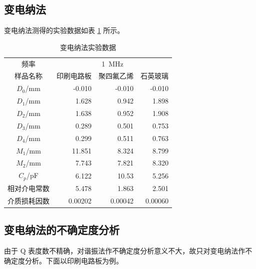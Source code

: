 \documentclass[a4paper,utf8]{article}
\begin{document}
\subsection{变电纳法}
变电纳法测得的实验数据如表 \ref{table:biandian} 所示。
\begin{table}[!ht]
    \caption{变电纳法实验数据} \label{table:biandian}
    \begin{tabular}{c*{3}{r}} \toprule
        频率 & \multicolumn{3}{c}{\SI{1}{\MHz}} \\
        样品名称 & 印刷电路板 & 聚四氟乙烯 & 石英玻璃 \\ \midrule
        $D_0$/\unit{\mm} & -0.010 & -0.010 & -0.010 \\
        $D_1$/\unit{\mm} & 1.628 & 0.942 & 1.898 \\
        $D_2$/\unit{\mm} & 1.638 & 0.952 & 1.908 \\
        $D_3$/\unit{\mm} & 0.289 & 0.501 & 0.753 \\
        $D_4$/\unit{\mm} & 0.299 & 0.511 & 0.763 \\
        $M_1$/\unit{\mm} & 11.851 & 8.324 & 8.799 \\
        $M_2$/\unit{\mm} & 7.743 & 7.821 & 8.320 \\
        $C_p$/\unit{\pF} & 6.122 & 10.53 & 5.256 \\
        相对介电常数 & 5.478 & 1.863 & 2.501 \\ 
        介质损耗因数 & 0.00202 & 0.00042 & 0.00060 \\ \bottomrule
    \end{tabular}
\end{table}

\subsection{变电纳法的不确定度分析}
由于 Q 表度数不精确，对谐振法作不确定度分析意义不大，故只对变电纳法作不确定度分析。下面以印刷电路板为例。
\end{document}

